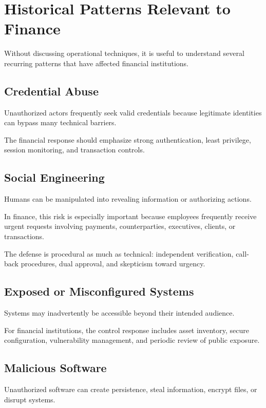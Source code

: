 \section{Historical Patterns Relevant to Finance}

Without discussing operational techniques, it is useful to understand several recurring patterns that have affected financial institutions.

\subsection{Credential Abuse}

Unauthorized actors frequently seek valid credentials because legitimate identities can bypass many technical barriers.

The financial response should emphasize strong authentication, least privilege, session monitoring, and transaction controls.

\subsection{Social Engineering}

Humans can be manipulated into revealing information or authorizing actions.

In finance, this risk is especially important because employees frequently receive urgent requests involving payments, counterparties, executives, clients, or transactions.

The defense is procedural as much as technical: independent verification, call-back procedures, dual approval, and skepticism toward urgency.

\subsection{Exposed or Misconfigured Systems}

Systems may inadvertently be accessible beyond their intended audience.

For financial institutions, the control response includes asset inventory, secure configuration, vulnerability management, and periodic review of public exposure.

\subsection{Malicious Software}

Unauthorized software can create persistence, steal information, encrypt files, or disrupt systems.

